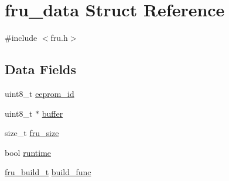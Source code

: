 \hypertarget{structfru__data}{\section{fru\-\_\-data Struct Reference}
\label{structfru__data}
}


{\ttfamily \#include $<$fru.\-h$>$}

\subsection*{Data Fields}
\begin{DoxyCompactItemize}
\item 
uint8\-\_\-t \hyperlink{structfru__data_a401009b7d19c3d5e104b2708001f57e4}{eeprom\-\_\-id}
\item 
uint8\-\_\-t $\ast$ \hyperlink{structfru__data_a62eb17a5914f49b64f89c344238ded19}{buffer}
\item 
size\-\_\-t \hyperlink{structfru__data_a5970b89059e93866e0f0bbd83bdc4081}{fru\-\_\-size}
\item 
bool \hyperlink{structfru__data_a147c5c360743fb7ac5dc665559c3cd35}{runtime}
\item 
\hyperlink{fru_8h_a41aff4730aa69cf10dd749b5befef9f5}{fru\-\_\-build\-\_\-t} \hyperlink{structfru__data_aced842ec141d2d3379f10400c0a7e3ca}{build\-\_\-func}
\end{DoxyCompactItemize}


